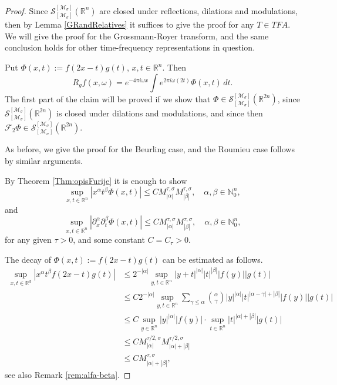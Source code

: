 \documentclass{article}
\theoremstyle{thmstyleone}
\theoremstyle{thmstyletwo}%
\theoremstyle{thmstylethree}%
\begin{document}
\begin{proof}
Since $\mathcal S_{[\mathcal{M}_\sigma ]}^{[\mathcal{M}_\sigma]} (\mathbb R^{n})$
are closed under reflections, dilations and modulations, then by Lemma \ref{GRandRelatives}
it suffices to give the proof for any $T \in TFA$.
We will give the proof for the Grossmann-Royer transform, and the same conclusion holds for other time-frequency representations in question. 

\par

Put $ \Phi (x,t) := f(2x -t) g (t)$, $x,t \in \mathbb R^{n}$.
Then 
$$
R_g f (x,\omega) = e^{-4\pi i \omega x}  \int e^{2\pi i \omega (2t) } \Phi (x,t)\, dt. 
$$
The first part of the claim will be proved 
if we show that
$ \Phi \in \mathcal S_{[\mathcal{M}_\sigma ]}^{[\mathcal{M}_\sigma]} (\mathbb R^{2n}) $,
since $  \mathcal S_{[\mathcal{M}_\sigma ]}^{[\mathcal{M}_\sigma]} (\mathbb R^{2n})$ is closed under dilations and modulations,
and since then $\mathcal F_2 \Phi \in 
  \mathcal S_{[\mathcal{M}_\sigma ]}^{[\mathcal{M}_\sigma]} (\mathbb R^{2n})$.
  
As before, we give the proof for the Beurling case, and the 
Roumieu case follows by similar arguments.

By Theorem \ref{Thm:opisFurije} it is enough to show
\begin{equation} \label{varphi po x}
\sup_{x,t \in \mathbb{R}^n}  
| x^{\alpha}  t^\beta  \Phi (x,t) | \leq C 
M^{\tau, \sigma} _{|\alpha|} M^{\tau, \sigma} _{|\beta|},\quad \alpha,\beta\in\mathbb N_0^n,
\end{equation}
and
\begin{equation} \label{varphi po ksi}
\sup_{x,t \in \mathbb{R}^n}  
|  \partial^\alpha _x \partial^\beta _t  \Phi (x,t) |
\leq C M^{\tau, \sigma} _{|\alpha|} M^{\tau, \sigma} _{|\beta|},\quad \alpha,\beta\in\mathbb N_0^n,
\end{equation}
for any given $\tau > 0$, and some constant $C= C_\tau >0$.

The decay of  $ \Phi (x,t) := f(2x -t) g (t)$ can be estimated as follows.
\begin{align}
\sup_{x,t \in \mathbb{R}^d}  | x^{\alpha}  t^\beta  f(2x-t) g (t) |
& \leq  
2^{-|\alpha|}\sup_{y,t \in \mathbb{R}^n}  |y+t|^{|\alpha|}  |t|^{|\beta|} 
|f(y) | |  g (t) | 
\nonumber \\
&\leq C 
2^{-|\alpha|}\sup_{y,t \in \mathbb{R}^n }
\sum_{\gamma \leq \alpha} \binom{\alpha}{\gamma}
|y|^{|\alpha|}  |t|^{|\alpha - \gamma| + |\beta|} 
|f(y) | |  g (t) | 
\nonumber \\
&\leq C  
\sup_{y \in \mathbb{R}^n} |y|^{|\alpha|}  |f(y) | \cdot
\sup_{t \in \mathbb{R}^n} |t|^{|\alpha| + |\beta|} 
 |  g (t) | 
\nonumber \\
& \leq
C  M^{\tau/2,\sigma}_{|\alpha |}  
M^{\tau/2,\sigma}_{|\alpha | +|\beta|} 
\nonumber \\
& \leq
C  M^{\tau,\sigma}_{|\alpha | + |\beta|}, 
\label{eq:est-mult}
\end{align}
see also Remark \ref{rem:alfa-beta}.


\end{proof}
\end{document}
